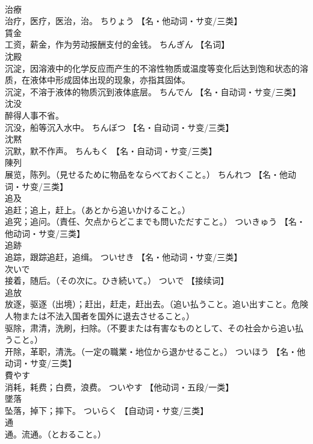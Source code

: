 \documentclass[8pt]{extreport}
\begin{document}
\begin{CJK}{UTF8}{min}
\\	治療	
\\	治疗，医疗，医治，治。	ちりょう		【名・他动词・サ变/三类】
\\	賃金	
\\	工资，薪金，作为劳动报酬支付的金钱。	ちんぎん		【名词】
\\	沈殿	
\\	沉淀，因溶液中的化学反应而产生的不溶性物质或温度等变化后达到饱和状态的溶质，在液体中形成固体出现的现象，亦指其固体。 
\\	沉淀，不溶于液体的物质沉到液体底层。	ちんでん		【名・自动词・サ变/三类】
\\	沈没	
\\	醉得人事不省。 
\\	沉没，船等沉入水中。	ちんぼつ		【名・自动词・サ变/三类】
\\	沈黙	
\\	沉默，默不作声。	ちんもく		【名・自动词・サ变/三类】
\\	陳列	
\\	展览，陈列。（見せるために物品をならべておくこと。）	ちんれつ		【名・他动词・サ变/三类】
\\	追及	
\\	追赶；追上，赶上。（あとから追いかけること。） 
\\	追究；追问。（責任、欠点からどこまでも問いただすこと。）	ついきゅう		【名・他动词・サ变/三类】
\\	追跡	
\\	追踪，跟踪追赶，追缉。	ついせき		【名・他动词・サ变/三类】
\\	次いで	
\\	接着，随后。（その次に。ひき続いて。）	ついで		【接续词】
\\	追放	
\\	放逐，驱逐（出境）；赶出，赶走，赶出去。（追い払うこと。追い出すこと。危険人物または不法入国者を国外に退去させること。） 
\\	驱除，肃清，洗刷，扫除。（不要または有害なものとして、その社会から追い払うこと。） 
\\	开除，革职，清洗。（一定の職業・地位から退かせること。）	ついほう		【名・他动词・サ变/三类】
\\	費やす	
\\	消耗，耗费；白费，浪费。	ついやす		【他动词・五段/一类】
\\	墜落	
\\	坠落，掉下；摔下。	ついらく		【自动词・サ变/三类】
\\	通	
\\	通。流通。（とおること。） 

\end{CJK}
\end{document}
